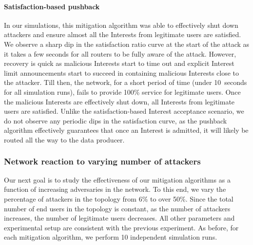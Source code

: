 \documentclass[10pt,conference]{IEEEtran}
\begin{document}
{\paragraph{\textbf{Satisfaction-based pushback}}

In our simulations, this mitigation algorithm was able to effectively shut down attackers and ensure almost all the Interests from legitimate users are satisfied. 
We observe a  sharp dip in the satisfaction ratio curve at the start of the attack as it takes a few seconds for all routers to be fully aware of the attack. However, recovery is quick as malicious Interests start to time out and explicit Interest limit announcements start to succeed in containing malicious Interests close to the attacker. Till then, the network, for a short period of time (under 10~seconds for all simulation runs), fails to provide 100\% service for legitimate users. Once the malicious Interests are effectively shut down, all Interests from legitimate users are satisfied. Unlike the satisfaction-based Interest acceptance scenario, we do not observe any periodic dips in the satisfaction curve, as the pushback algorithm effectively guarantees that once an Interest is admitted, it will likely be routed all the way to the data producer.

\subsubsection{Network reaction to varying number of attackers}

Our next goal is to study the effectiveness of our mitigation algorithms as a function of increasing adversaries in the network.
To this end, we vary the percentage of attackers in the topology from 6\% to over 50\%. Since the total number of end users in the topology is constant, as the number of attackers increases, the number of legitimate users decreases. All other parameters and experimental setup are consistent with the previous experiment. As before, for each mitigation algorithm, we perform 10 independent simulation runs.

}
\end{document}
